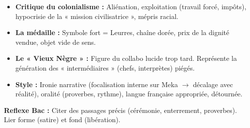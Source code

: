 \documentclass[11pt]{article}
\newcommand{\cle}[1]{{\popxbold\color{popdark}#1}}
\begin{document}
\begin{methode}
\begin{enumerate}
            \begin{itemize}
                \item \textbf{Critique du colonialisme :} Aliénation, exploitation (travail forcé, impôts), hypocrisie de la « mission civilisatrice », mépris racial.
                \item \textbf{La médaille :} \cle{Symbole fort} = Leurres, chaîne dorée, prix de la dignité vendue, objet vide de sens.
                \item \textbf{Le « Vieux Nègre » :} Figure du \cle{collabo} lucide trop tard. Représente la génération des « intermédiaires » (chefs, interprètes) piégés.
                \item \textbf{Style :} \cle{Ironie narrative} (focalisation interne sur Meka $\rightarrow$ décalage avec réalité), \cle{oralité} (proverbes, rythme), \cle{langue française} appropriée, détournée.
            \end{itemize}
    \end{enumerate}
    \textbf{Reflexe Bac :} Citer des passages précis (cérémonie, enterrement, proverbes). Lier forme (satire) et fond (libération).
\end{methode}
\end{document}
